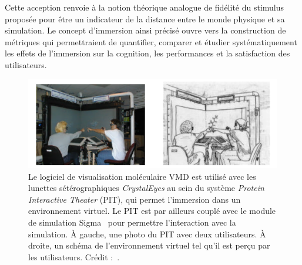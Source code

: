 \begin{displayquote}
	    Cette acception renvoie à la notion théorique analogue de \og fidélité du stimulus \fg{}~\cite{stoffregen2003nature} proposée pour être un indicateur de la distance entre le monde physique et sa simulation. Le concept d'immersion ainsi précisé ouvre vers la construction de métriques qui permettraient de quantifier, comparer et étudier systématiquement les effets de l'immersion sur la cognition, les performances et la satisfaction des utilisateurs.
	\end{displayquote}
	
	\begin{figure}[H]
		\centering
		\includegraphics[width=\textwidth]{figures/ch1/steeredPIT}
		\caption[Dynamique moléculaire interactive en environnement virtuel.]{Le logiciel de visualisation moléculaire VMD est utilisé avec les lunettes sétérographiques \emph{CrystalEyes} au sein du système \emph{Protein Interactive Theater} (PIT), qui permet l'immersion dans un environnement virtuel. Le PIT est par ailleurs couplé avec le module de simulation Sigma~\cite{mann2002sigma} pour permettre l'interaction avec la simulation. À gauche, une photo du PIT avec deux utilisateurs. À droite, un schéma de l'environnement virtuel tel qu'il est perçu par les utilisateurs. Crédit :~\cite{prins1999virtual}.}
		\label{fig:steeredPIT}
	\end{figure}
	
